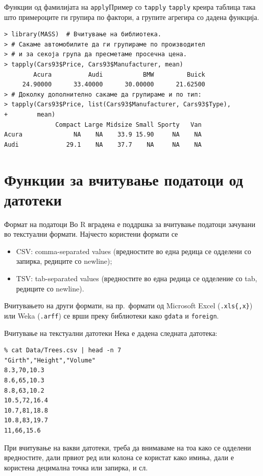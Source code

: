 \documentclass[hyperref={unicode}, xcolor={svgnames, table},
usepdftitle=false]{beamer}
\theoremstyle{remark}
\begin{document}
\begin{frame}[fragile]{Функции од фамилијата на \texttt{apply}}{Пример со
    \texttt{tapply}}
  \texttt{tapply} креира таблица така што примероците ги групира по
  фактори, а групите агрегира со дадена функција.
\begin{verbatim}
> library(MASS)  # Вчитување на библиотека.
> # Сакаме автомобилите да ги групираме по производител
> # и за секоја група да пресметаме просечна цена.
> tapply(Cars93$Price, Cars93$Manufacturer, mean)
        Acura          Audi           BMW         Buick
     24.90000      33.40000      30.00000      21.62500
> # Доколку дополнително сакаме да групираме и по тип:
> tapply(Cars93$Price, list(Cars93$Manufacturer, Cars93$Type),
+        mean)
              Compact Large Midsize Small Sporty   Van
Acura              NA    NA    33.9 15.90     NA    NA
Audi             29.1    NA    37.7    NA     NA    NA
\end{verbatim}
\end{frame}

\section{Функции за вчитување податоци од датотеки}

\begin{frame}{Формат на податоци}
  Во R вградена е поддршка за вчитување податоци зачувани во текстуални формати.
  Најчесто користени формати се
  \begin{itemize}
  \item CSV: comma-separated values (вредностите во една редица се одделени со
    запирка, редиците со newline);
  \item TSV: tab-separated values (вредностите во една редица се одделение со
    tab, редиците со newline).
  \end{itemize}

  Вчитувањето на други формати, на пр.\ формати од Microsoft Excel
  (\texttt{.xls\{,x\}}) или Weka (\texttt{.arff}) се врши преку библиотеки како
  \texttt{gdata} и \texttt{foreign}.
\end{frame}

\begin{frame}[fragile]{Вчитување на текстуални датотеки}
  Нека е дадена следната датотека:
\begin{verbatim}
% cat Data/Trees.csv | head -n 7
"Girth","Height","Volume"
8.3,70,10.3
8.6,65,10.3
8.8,63,10.2
10.5,72,16.4
10.7,81,18.8
10.8,83,19.7
11,66,15.6
\end{verbatim}
  При вчитување на вакви датотеки, треба да внимаваме на тоа како се одделени
  вредностите, дали првиот ред или колона се користат како имиња, дали е
  користена децимална точка или запирка, и сл.
\end{frame}
\end{document}
